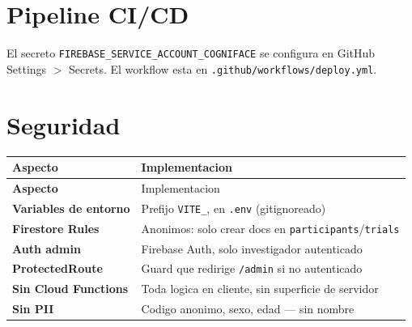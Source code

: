 \documentclass[12pt,a4paper]{article}
\begin{document}
\section{Pipeline CI/CD}

\begin{center}
\end{center}

El secreto \texttt{FIREBASE\_SERVICE\_ACCOUNT\_COGNIFACE} se configura en
GitHub Settings $>$ Secrets. El workflow esta en
\texttt{.github/workflows/deploy.yml}.

\section{Seguridad}

\begin{longtable}{>{\bfseries}p{4.2cm} p{9cm}}
\toprule
Aspecto & Implementacion \\
\midrule
\endfirsthead
\toprule
Aspecto & Implementacion \\
\midrule
\endhead
\bottomrule
\endfoot
Variables de entorno & Prefijo \texttt{VITE\_}, en \texttt{.env} (gitignoreado) \\
Firestore Rules      & Anonimos: solo crear docs en \texttt{participants}/\texttt{trials} \\
Auth admin           & Firebase Auth, solo investigador autenticado \\
ProtectedRoute       & Guard que redirige \texttt{/admin} si no autenticado \\
Sin Cloud Functions  & Toda logica en cliente, sin superficie de servidor \\
Sin PII              & Codigo anonimo, sexo, edad --- sin nombre \\
\end{longtable}
\end{document}
